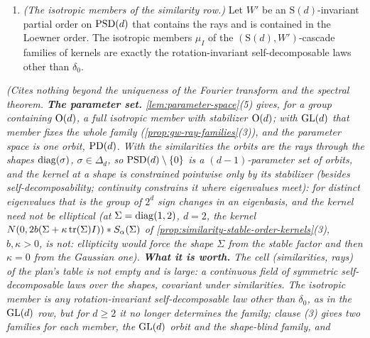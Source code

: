 \begin{proposition}
\begin{enumerate}
$\mu_{sI} = (\sqrt s\,I)_*\mu_I$ for $s \ge 0$, and $\mu_I$ is rotation invariant, self-decomposable and
not $\delta_0$. Conversely, let $\mu_I$ be such a law. Then (i) $\Sigma \mapsto (\Sigma^{1/2})_*\mu_I$ and
(ii) $\Sigma \mapsto \nu_\Sigma := ((\det\Sigma)^{1/(2d)}I)_*\mu_I$ are the kernels from scale zero of
$(\mathrm S(d), W)$-cascade families with isotropic member $\mu_I$, and (ii) is also the family of kernels
from scale zero of an $(\mathrm S(d), \text{Loewner})$-cascade family. For $d \ge 2$ the two differ at
every $\Sigma \in \PD(d)$ that is not a multiple of $I$.
\item \emph{(The isotropic members of the similarity row.)} Let $W'$ be an $\mathrm S(d)$-invariant
partial order on $\mathrm{PSD}(d)$ that contains the rays and is contained in the Loewner order. The isotropic
members $\mu_I$ of the $(\mathrm S(d), W')$-cascade families of kernels are exactly the rotation-invariant
self-decomposable laws other than $\delta_0$.
\end{enumerate}
\statusT\quad\emph{(Cites nothing beyond the uniqueness of the Fourier transform and the spectral
theorem. \textbf{The parameter set.} \ref{lem:parameter-space}(5) gives, for a group containing
$\mathrm{O}(d)$, a full isotropic member with stabilizer $\mathrm{O}(d)$; with $\mathrm{GL}(d)$ that member fixes the whole
family (\ref{prop:gw-ray-families}(3)), and the parameter space is one orbit, $\mathrm{PD}(d)$. With the
similarities the orbits are the rays through the shapes $\operatorname{diag}(\sigma)$, $\sigma \in \Delta_d$, so
$\mathrm{PSD}(d) \setminus \{0\}$ is a $(d-1)$-parameter set of orbits, and the kernel at a shape is
constrained pointwise only by its stabilizer (besides self-decomposability; continuity constrains it
where eigenvalues meet): for distinct eigenvalues that is the group of $2^d$ sign changes in an
eigenbasis, and the kernel need not be elliptical (at $\Sigma = \operatorname{diag}(1,2)$, $d = 2$, the kernel
$N(0, 2b(\Sigma + \kappa\operatorname{tr}(\Sigma)I)) * S_\alpha(\Sigma)$ of \ref{prop:similarity-stable-order-kernels}(3),
$b, \kappa > 0$, is not: ellipticity would force the shape $\Sigma$ from the stable factor and then
$\kappa = 0$ from the Gaussian one). \textbf{What it is worth.} The cell
(similarities, rays) of the plan's table is not empty and is large: a continuous field of symmetric
self-decomposable laws over the shapes, covariant under similarities. The isotropic member is any
rotation-invariant self-decomposable law other than $\delta_0$, as in the $\mathrm{GL}(d)$ row, but for
$d \ge 2$ it no longer determines the family; clause (3) gives two families for each member, the $\mathrm{GL}(d)$ orbit and the shape-blind family, and
}
\end{proposition}
